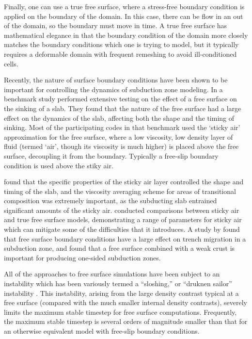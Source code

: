 \documentclass[preprint,12pt,authoryear]{elsarticle}
\begin{document}
Finally, one can use a true free surface, where a stress-free boundary condition is applied on the boundary 
of the domain. In this case, there can be flow in an out of the domain, so the boundary must move in time.
A true free surface has mathematical elegance in that the boundary condition of the domain more closely 
matches the boundary conditions which one is trying to model, but it typically requires a deformable 
domain with frequent remeshing to avoid ill-conditioned cells. 

Recently, the nature of surface boundary conditions have been shown to be important for controlling the 
dynamics of subduction zone modeling.  In a benchmark study \citet{schmeling2008benchmark} performed extensive testing on the effect
of a free surface on the sinking of a slab. They found that the nature of the free surface had a large effect 
on the dynamics of the slab, affecting both the shape and the timing of sinking. Most of the 
participating codes in that benchmark used the `sticky air' approximation for the free surface, where a low viscosity,
low density layer of fluid (termed `air', though its viscosity is much higher) is placed above the free surface, decoupling 
it from the boundary. Typically a free-slip boundary condition is used above the stiky air. 

\citet{schmeling2008benchmark} found that the specific properties of the sticky air layer 
controlled the shape and timing of the slab, and the viscosity averaging scheme for areas of transitional
composition was extremely important, as the subducting slab entrained significant amounts of the sticky air.
\citet{crameri2012comparison} conducted comparisons between sticky air and true free surface models, 
demonstrating a range of parameters for sticky air which can mitigate some of the difficulties that it introduces.
A study by \citet{quinquis2011role} found that free surface boundary conditions have a large effect on 
trench migration in a subduction zone, and \citet{crameri2012free} found that a free surface combined 
with a weak crust is important for producing one-sided subduction zones.

All of the approaches to free surface simulations have been subject to an instability which has been 
variously termed a ``sloshing,'' or ``druknen sailor'' instability \citep{kaus2010stabilization, duretz2011discretization, kramer2012implicit}. 
This instability, arising from the large density contrast typical at a free surface (compared with the much smaller 
internal density contrasts), severely limits the maximum stable timestep for free surface computations.
Frequently, the maximum stable timestep is several orders of magnitude smaller than that for an otherwise 
equivalent model with free-slip boundary conditions.
\end{document}
